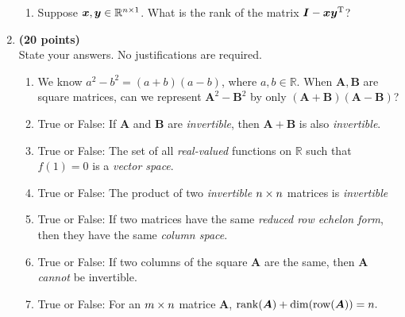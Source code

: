 \begin{enumerate}
\begin{enumerate}
\item
Suppose $\bm x,\bm y\in\mathbb{R}^{n\times 1}$. What is the rank of the matrix $\bm I-\bm x\bm y^{\mathrm T}$?\end{enumerate}
\newpage
\item \textbf{(20 points)} \\
State your answers. No justifications are required.
\begin{enumerate}
\item
We know $a^2-b^2=(a+b)(a-b)$, where $a,b\in\mathbb{R}$. When $\bm A,\bm B$ are square matrices, can we
represent $\bm A^2-\bm B^2$ by only $(\bm A+\bm B)(\bm A-\bm B)$?\\
\item
True or False: If $\bm A$ and $\bm B$ are \textit{invertible}, then $\bm A+\bm B$ is also \textit{invertible}.\\
\item
True or False: The set of all \textit{real-valued} functions on $\mathbb{R}$ such that $f(1)=0$ is a \textit{vector space}.\\
\item
True or False: The product of two \textit{invertible} $n\times n$ matrices is \textit{invertible}\\
\item
True or False: If two matrices have the same \textit{reduced row echelon form}, then they have the
same \textit{column space}.\\
\item
True or False: If two columns of the square $\bm A$ are the same, then $\bm A$ \textit{cannot} be invertible.\\
\item
True or False: For an $m\times n$ matrice $\bm A$, $\operatorname{rank}(\bm A)+\dim(\operatorname{row}(\bm A))=n.$
\end{enumerate}
\end{enumerate}